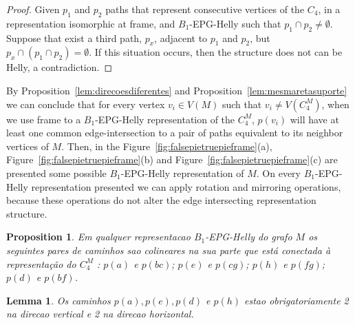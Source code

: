 \documentclass[a4paper,11pt]{article}
\newtheorem{lema}[theorem]{Lemma}
\newtheorem{prop}[theorem]{Proposition}
\begin{document}
\begin{proof}
Given $p_1$ and $p_2$ paths that represent consecutive vertices of the $C_4$, in a representation isomorphic at frame, and $B_1$-EPG-Helly such that $p_1 \cap p_2 \neq \emptyset$.
Suppose that exist a third path, $p_x$, adjacent to $p_1$ and $p_2$, but $p_x \cap (p_1 \cap p_2) = \emptyset$. If this situation occurs, then the structure does not can be  Helly, a contradiction.
\end{proof}


By Proposition~\ref{lem:direcoesdiferentes} and Proposition~\ref{lem:mesmaretasuporte} we can conclude that for every vertex $v_i \in V(M)$ such that $v_i \neq V(C_4^M)$, when we use frame to a $B_{1}$-EPG-Helly representation of the $C_4^M$, $p(v_i)$ will have at least one common edge-intersection to a pair of paths equivalent to its neighbor vertices of $M$. Then, in the Figure~\ref{fig:falsepietruepieframe}(a), Figure~\ref{fig:falsepietruepieframe}(b) and Figure~\ref{fig:falsepietruepieframe}(c) are presented some possible $B_{1}$-EPG-Helly representation of $M$. On every $B_{1}$-EPG-Helly representation presented we can apply rotation and mirroring operations, because these operations do not alter the edge intersecting representation structure.


\begin{prop}
Em qualquer representacao $B_{1}$-EPG-Helly do grafo $M$ os seguintes pares de caminhos sao colineares na sua parte que está conectada à representação do $C_4^M$ : $p(a)$ e $p(bc)$; $p(e)$ e $p(cg)$; $p(h)$ e $p(fg)$; $p(d)$ e $p(bf)$.
\end{prop}

\begin{lema}
Os caminhos $p(a), p(e), p(d)$ e $p(h)$ estao obrigatoriamente 2 na direcao vertical e 2 na direcao horizontal.
\end{lema}



%



\end{document}
